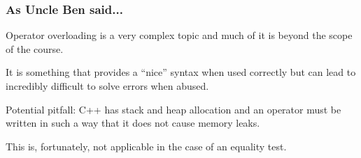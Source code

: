 \begin{frame}
\frametitle{As Uncle Ben said...}

Operator overloading is a very complex topic and much of it is beyond the scope of the course. 

It is something that provides a ``nice'' syntax when used correctly but can lead to incredibly difficult to solve errors when abused.

Potential pitfall: C++ has stack and heap allocation and an operator must be written in such a way that it does not cause memory leaks.

This is, fortunately, not applicable in the case of an equality test.


\end{frame}



